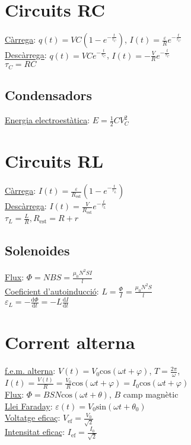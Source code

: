 \documentclass[12pt]{article}
\begin{document}
\begin{multicols}{5}

\section{Circuits RC}

\underline{Càrrega}: $q(t) = VC\left( 1 - e^{-\frac{t}{\tau_C}}\right)$, $I(t) = \frac{\varepsilon}{R} e^{-\frac{t}{\tau_C}}$ \\
\underline{Descàrrega}: $q(t) = VCe^{-\frac{t}{\tau_C}}$, $I(t) = -\frac{V}{R}e^{-\frac{t}{\tau_C}}$ \\

$\tau_C = RC$

\subsection{Condensadors}

\underline{Energia electroestàtica}: $E = \frac{1}{2}CV_C^2$

\section{Circuits RL}
\underline{Càrrega}: $I(t) = \frac{\varepsilon}{R_{\text{est}}} \left(1 - e^{-\frac{t}{\tau_L}}\right)$ \\
\underline{Descàrrega}: $I(t) = \frac{V}{R_{\text{est}}}e^{-\frac{t}{\tau_L}}$ \\
$\tau_L = \frac{L}{R}, R_{\text{est}} = R + r$

\subsection{Solenoides}

\underline{Flux}: $\Phi = NBS = \frac{\mu_0 N^2SI}{l}$ \\
\underline{Coeficient d'autoinducció}: $L = \frac{\Phi}{I} = \frac{\mu_0N^2S}{l}$ \\
$\varepsilon_L= -\frac{\text{d}\Phi}{\text{d}t} = -L \frac{\text{d}I}{\text{d}t}$

\section{Corrent alterna}

\underline{f.e.m. alterna}: $V(t) = V_0\text{cos}(\omega t+\varphi)$, $T = \frac{2\pi}{\omega}$, $I(t) = \frac{V(t)}{R} = \frac{V_0}{R}\text{cos}(\omega t + \varphi) = I_0\text{cos}(\omega t + \varphi)$ \\
\underline{Flux}: $\Phi = BSN\text{cos}(\omega t+\theta)$, $B$ camp magnètic \\
\underline{Llei Faraday}: $\varepsilon(t) = V_0\text{sin}(\omega t + \theta_0)$ \\
\underline{Voltatge eficaç}: $V_{\text{ef}} = \frac{V_0}{\sqrt{2}}$ \\
\underline{Intensitat eficaç}: $I_{\text{ef}} = \frac{I_0}{\sqrt{2}}$


\end{multicols}
\end{document}
